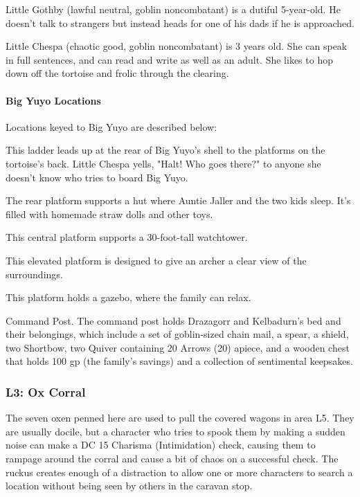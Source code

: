 \documentclass[10pt,a4paper,twoside,twocolumn,openany,nodeprecatedcode]{dndbook}
\begin{document}
Little Gothby (lawful neutral, goblin noncombatant) is a dutiful 5-year-old. He doesn't talk to strangers but instead heads for one of his dads if he is approached.

Little Chespa (chaotic good, goblin noncombatant) is 3 years old. She can speak in full sentences, and can read and write as well as an adult. She likes to hop down off the tortoise and frolic through the clearing.

\paragraph{Big Yuyo Locations}
Locations keyed to Big Yuyo are described below:


\begin{description}[nolistsep]
\item[L2a: Upladder.]
This ladder leads up at the rear of Big Yuyo's shell to the platforms on the tortoise's back. Little Chespa yells, "Halt! Who goes there?" to anyone she doesn't know who tries to board Big Yuyo.
\item[L2b: Rear Hut.]
The rear platform supports a hut where Auntie Jaller and the two kids sleep. It's filled with homemade straw dolls and other toys.
\item[L2c: Central Platform.]
This central platform supports a 30-foot-tall watchtower.
\item[L2d: Archery Tower.]
This elevated platform is designed to give an archer a clear view of the surroundings.
\item[L2e: Starboard Gazebo.]
This platform holds a gazebo, where the family can relax.
\item[L2f:]
Command Post. The command post holds Drazagorr and Kelbadurn's bed and their belongings, which include a set of goblin-sized chain mail, a spear, a shield, two Shortbow, two Quiver containing 20 Arrows (20) apiece, and a wooden chest that holds 100 gp (the family's savings) and a collection of sentimental keepsakes.
\end{description}

\subsubsection{L3: Ox Corral}
The seven oxen penned here are used to pull the covered wagons in area L5. They are usually docile, but a character who tries to spook them by making a sudden noise can make a DC 15 Charisma (Intimidation) check, causing them to rampage around the corral and cause a bit of chaos on a successful check. The ruckus creates enough of a distraction to allow one or more characters to search a location without being seen by others in the caravan stop.
\end{document}
